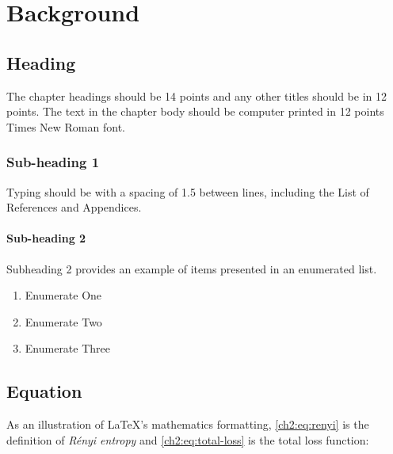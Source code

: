 \chapter{Background}		
\label{chapter2}


\section{Heading}

\begin{paragraph}
The chapter headings should be 14 points and any other titles should be in 12 points.  The text in the chapter body should be computer printed in 12 points Times New Roman font.
\end{paragraph}

\subsection{Sub-heading 1}

\begin{subparagraph}
Typing should be with a spacing of 1.5 between lines, including the List of References and Appendices.
\end{subparagraph}






\subsubsection{Sub-heading 2}

\begin{subsubparagraph}
Subheading 2 provides an example of items presented in an enumerated list.
\end{subsubparagraph}

\begin{enumerate}[itemindent=\subsubparitemindent]
\item Enumerate One
\item Enumerate Two
\item Enumerate Three
\end{enumerate}


\section{Equation} 

\begin{paragraph}
As an illustration of \LaTeX's mathematics formatting,
\autoref{ch2:eq:renyi} is the definition of {\em R\'enyi entropy} and \autoref{ch2:eq:total-loss} is the total loss function:
\end{paragraph}

